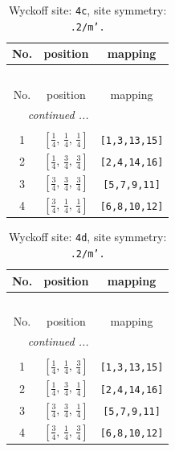 \documentclass[fleqn,8pt]{jsarticle}
\begin{document}
\renewcommand{\arraystretch}{1.2}
\begin{longtable}{ccc}
\caption{Wyckoff site: {\tt 4c}, site symmetry: {\tt .2/m'.}}
 \\
 \hline \hline
No. & position & mapping \\ \hline \endfirsthead

\multicolumn{2}{l}{\tablename\ \thetable{}} \\
 \hline \hline
No. & position & mapping \\ \hline \endhead

 \hline \hline
\multicolumn{2}{r}{\footnotesize\it continued ...} \\ \endfoot

 \hline \hline
\multicolumn{2}{r}{} \\ \endlastfoot

1 & $\left[ \frac{1}{4},\, \frac{1}{4},\, \frac{1}{4} \right]$ & {\tt [1,3,13,15]} \\ \hline
2 & $\left[ \frac{1}{4},\, \frac{3}{4},\, \frac{3}{4} \right]$ & {\tt [2,4,14,16]} \\ \hline
3 & $\left[ \frac{3}{4},\, \frac{3}{4},\, \frac{3}{4} \right]$ & {\tt [5,7,9,11]} \\ \hline
4 & $\left[ \frac{3}{4},\, \frac{1}{4},\, \frac{1}{4} \right]$ & {\tt [6,8,10,12]} \\
\end{longtable}
\renewcommand{\arraystretch}{1.2}
\begin{longtable}{ccc}
\caption{Wyckoff site: {\tt 4d}, site symmetry: {\tt .2/m'.}}
 \\
 \hline \hline
No. & position & mapping \\ \hline \endfirsthead

\multicolumn{2}{l}{\tablename\ \thetable{}} \\
 \hline \hline
No. & position & mapping \\ \hline \endhead

 \hline \hline
\multicolumn{2}{r}{\footnotesize\it continued ...} \\ \endfoot

 \hline \hline
\multicolumn{2}{r}{} \\ \endlastfoot

1 & $\left[ \frac{1}{4},\, \frac{1}{4},\, \frac{3}{4} \right]$ & {\tt [1,3,13,15]} \\ \hline
2 & $\left[ \frac{1}{4},\, \frac{3}{4},\, \frac{1}{4} \right]$ & {\tt [2,4,14,16]} \\ \hline
3 & $\left[ \frac{3}{4},\, \frac{3}{4},\, \frac{1}{4} \right]$ & {\tt [5,7,9,11]} \\ \hline
4 & $\left[ \frac{3}{4},\, \frac{1}{4},\, \frac{3}{4} \right]$ & {\tt [6,8,10,12]} \\
\end{longtable}
\end{document}
